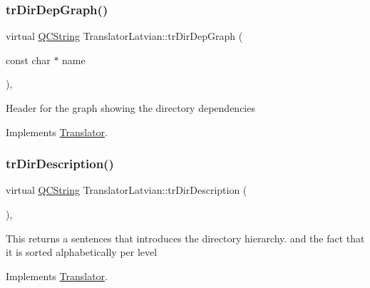 \mbox{\label{class_translator_latvian_ac0ea9473771f1a879c2cba8ada52a935}} 
\subsubsection{\texorpdfstring{trDirDepGraph()}{trDirDepGraph()}}
{\footnotesize\ttfamily virtual \mbox{\hyperlink{class_q_c_string}{Q\+C\+String}} Translator\+Latvian\+::tr\+Dir\+Dep\+Graph (\begin{DoxyParamCaption}\item[{const char $\ast$}]{name }\end{DoxyParamCaption})\hspace{0.3cm}{\ttfamily [inline]}, {\ttfamily [virtual]}}

Header for the graph showing the directory dependencies 

Implements \mbox{\hyperlink{class_translator}{Translator}}.

\mbox{\label{class_translator_latvian_acd00745bf1d0ec44860d5701867fe5ef}} 
\subsubsection{\texorpdfstring{trDirDescription()}{trDirDescription()}}
{\footnotesize\ttfamily virtual \mbox{\hyperlink{class_q_c_string}{Q\+C\+String}} Translator\+Latvian\+::tr\+Dir\+Description (\begin{DoxyParamCaption}{ }\end{DoxyParamCaption})\hspace{0.3cm}{\ttfamily [inline]}, {\ttfamily [virtual]}}

This returns a sentences that introduces the directory hierarchy. and the fact that it is sorted alphabetically per level 

Implements \mbox{\hyperlink{class_translator}{Translator}}.

\mbox{\label{class_translator_latvian_a90f3bfe6d0e97a539c4c7ac41b20dc1b}} 
